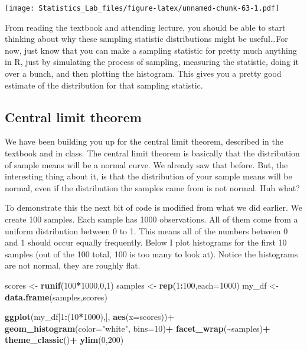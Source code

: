 \documentclass[
]{book}
\newenvironment{Shaded}{\begin{snugshade}}{\end{snugshade}}
\newcommand{\AttributeTok}[1]{\textcolor[rgb]{0.13,0.29,0.53}{#1}}
\newcommand{\DecValTok}[1]{\textcolor[rgb]{0.00,0.00,0.81}{#1}}
\newcommand{\FunctionTok}[1]{\textcolor[rgb]{0.13,0.29,0.53}{\textbf{#1}}}
\newcommand{\NormalTok}[1]{#1}
\newcommand{\OtherTok}[1]{\textcolor[rgb]{0.56,0.35,0.01}{#1}}
\newcommand{\SpecialCharTok}[1]{\textcolor[rgb]{0.81,0.36,0.00}{\textbf{#1}}}
\newcommand{\StringTok}[1]{\textcolor[rgb]{0.31,0.60,0.02}{#1}}
\begin{document}
\texttt{[image: Statistics\_Lab\_files/figure-latex/unnamed-chunk-63-1.pdf]}

From reading the textbook and attending lecture, you should be able to
start thinking about why these sampling statistic distributions might be
useful\ldots For now, just know that you can make a sampling statistic for
pretty much anything in R, just by simulating the process of sampling,
measuring the statistic, doing it over a bunch, and then plotting the
histogram. This gives you a pretty good estimate of the distribution for
that sampling statistic.

\hypertarget{central-limit-theorem}{%
\subsection{Central limit theorem}\label{central-limit-theorem}}

We have been building you up for the central limit theorem, described in
the textbook and in class. The central limit theorem is basically that
the distribution of sample means will be a normal curve. We already saw
that before. But, the interesting thing about it, is that the
distribution of your sample means will be normal, even if the
distribution the samples came from is not normal. Huh what?

To demonstrate this the next bit of code is modified from what we did
earlier. We create 100 samples. Each sample has 1000 observations. All
of them come from a uniform distribution between 0 to 1. This means all
of the numbers between 0 and 1 should occur equally frequently. Below I
plot histograms for the first 10 samples (out of the 100 total, 100 is
too many to look at). Notice the histograms are not normal, they are
roughly flat.

\begin{Shaded}
\begin{Highlighting}[]
\NormalTok{scores }\OtherTok{\textless{}{-}} \FunctionTok{runif}\NormalTok{(}\DecValTok{100}\SpecialCharTok{*}\DecValTok{1000}\NormalTok{,}\DecValTok{0}\NormalTok{,}\DecValTok{1}\NormalTok{)}
\NormalTok{samples }\OtherTok{\textless{}{-}} \FunctionTok{rep}\NormalTok{(}\DecValTok{1}\SpecialCharTok{:}\DecValTok{100}\NormalTok{,}\AttributeTok{each=}\DecValTok{1000}\NormalTok{)}
\NormalTok{my\_df }\OtherTok{\textless{}{-}} \FunctionTok{data.frame}\NormalTok{(samples,scores)}

\FunctionTok{ggplot}\NormalTok{(my\_df[}\DecValTok{1}\SpecialCharTok{:}\NormalTok{(}\DecValTok{10}\SpecialCharTok{*}\DecValTok{1000}\NormalTok{),], }\FunctionTok{aes}\NormalTok{(}\AttributeTok{x=}\NormalTok{scores))}\SpecialCharTok{+}
  \FunctionTok{geom\_histogram}\NormalTok{(}\AttributeTok{color=}\StringTok{"white"}\NormalTok{, }\AttributeTok{bins=}\DecValTok{10}\NormalTok{)}\SpecialCharTok{+}
  \FunctionTok{facet\_wrap}\NormalTok{(}\SpecialCharTok{\textasciitilde{}}\NormalTok{samples)}\SpecialCharTok{+}
  \FunctionTok{theme\_classic}\NormalTok{()}\SpecialCharTok{+}
  \FunctionTok{ylim}\NormalTok{(}\DecValTok{0}\NormalTok{,}\DecValTok{200}\NormalTok{)}
\end{Highlighting}
\end{Shaded}
\end{document}
